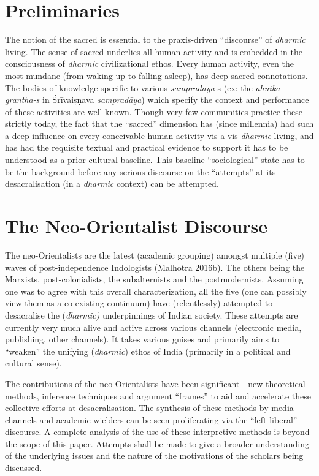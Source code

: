\section*{Preliminaries}

The notion of the sacred is essential to the praxis-driven “discourse” of \textit{dharmic} living. The sense of sacred underlies all human activity and is embedded in the consciousness of \textit{dharmic} civilizational ethos. Every human activity, even the most mundane (from waking up to falling asleep), has deep sacred connotations. The bodies of knowledge specific to various \textit{sampradāya}-s (ex: the \textit{āhnika grantha-s }in Śrīvaiṣṇava \textit{sampradāya}) which specify the context and performance of these activities are well known. Though very few communities practice these strictly today, the fact that the “sacred” dimension has (since millennia) had such a deep influence on every conceivable human activity vis-a-vis \textit{dharmic} living, and has had the requisite textual and practical evidence to support it has to be understood as a prior cultural baseline. This baseline “sociological” state has to be the background before any serious discourse on the “attempts” at its desacralisation (in a \textit{dharmic} context) can be attempted.


\section*{The Neo-Orientalist Discourse}

The neo-Orientalists are the latest (academic grouping) amongst multiple (five) waves of post-independence Indologists (Malhotra 2016b). The others being the Marxists, post-colonialists, the subalternists and the postmodernists. Assuming one was to agree with this overall characterization, all the five (one can possibly view them as a co-existing continuum) have (relentlessly) attempted to desacralise the (\textit{dharmic)} underpinnings of Indian society. These attempts are currently very much alive and active across various channels (electronic media, publishing, other channels). It takes various guises and primarily aims to “weaken” the unifying (\textit{dharmic}) ethos of India (primarily in a political and cultural sense).

The contributions of the neo-Orientalists have been significant - new theoretical methods, inference techniques and argument “frames” to aid and accelerate these collective efforts at desacralisation. The synthesis of these methods by media channels and academic wielders can be seen proliferating via the “left liberal” discourse. A complete analysis of the use of these interpretive methods is beyond the scope of this paper. Attempts shall be made to give a broader understanding of the underlying issues and the nature of the motivations of the scholars being discussed.


